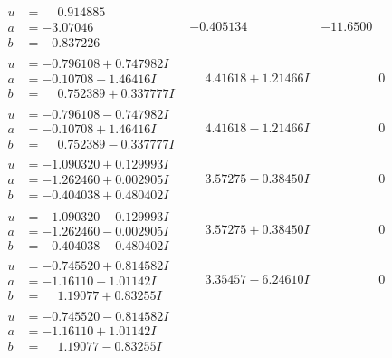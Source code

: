 \documentclass[1p]{elsarticle_modified}
\theoremstyle{definition}
\begin{document}
$$\begin{array}{c|c|c}
\begin{aligned}
u &= \phantom{-}0.914885\phantom{ +0.000000I} \\
a &= -3.07046\phantom{ +0.000000I} \\
b &= -0.837226\phantom{ +0.000000I}\end{aligned}
 & -0.405134\phantom{ +0.000000I} & -11.6500\phantom{ +0.000000I} \\ \hline\begin{aligned}
u &= -0.796108 + 0.747982 I \\
a &= -0.10708 - 1.46416 I \\
b &= \phantom{-}0.752389 + 0.337777 I\end{aligned}
 & \phantom{-}4.41618 + 1.21466 I & \phantom{-0.000000 } 0 \\ \hline\begin{aligned}
u &= -0.796108 - 0.747982 I \\
a &= -0.10708 + 1.46416 I \\
b &= \phantom{-}0.752389 - 0.337777 I\end{aligned}
 & \phantom{-}4.41618 - 1.21466 I & \phantom{-0.000000 } 0 \\ \hline\begin{aligned}
u &= -1.090320 + 0.129993 I \\
a &= -1.262460 + 0.002905 I \\
b &= -0.404038 + 0.480402 I\end{aligned}
 & \phantom{-}3.57275 - 0.38450 I & \phantom{-0.000000 } 0 \\ \hline\begin{aligned}
u &= -1.090320 - 0.129993 I \\
a &= -1.262460 - 0.002905 I \\
b &= -0.404038 - 0.480402 I\end{aligned}
 & \phantom{-}3.57275 + 0.38450 I & \phantom{-0.000000 } 0 \\ \hline\begin{aligned}
u &= -0.745520 + 0.814582 I \\
a &= -1.16110 - 1.01142 I \\
b &= \phantom{-}1.19077 + 0.83255 I\end{aligned}
 & \phantom{-}3.35457 - 6.24610 I & \phantom{-0.000000 } 0 \\ \hline\begin{aligned}
u &= -0.745520 - 0.814582 I \\
a &= -1.16110 + 1.01142 I \\
b &= \phantom{-}1.19077 - 0.83255 I\end{aligned}

\end{array}$$
\end{document}

